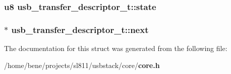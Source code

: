 \subsubsection{\setlength{\rightskip}{0pt plus 5cm}u8 {\bf usb\_\-transfer\_\-descriptor\_\-t::state}}\label{structusb__transfer__descriptor__t_917bef40da0319a85cf54024f9489453}


\subsubsection{$\ast$ {\bf usb\_\-transfer\_\-descriptor\_\-t::next}}\label{structusb__transfer__descriptor__t_4b74b064adb74bcfc9c4e769390da17c}




The documentation for this struct was generated from the following file:\begin{CompactItemize}
\item 
/home/bene/projects/sl811/usbstack/core/{\bf core.h}\end{CompactItemize}
